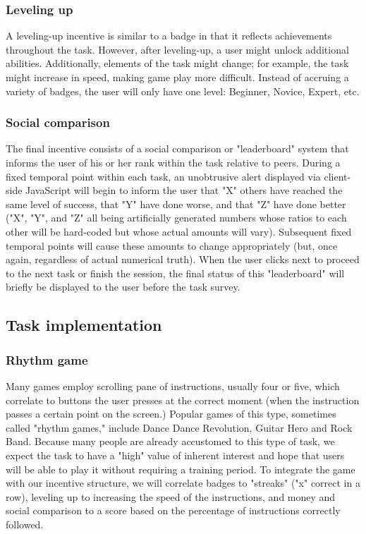 \subsubsection{Leveling up} 
A leveling-up incentive is similar to a badge in that it reflects achievements throughout the task. However, after leveling-up, a user might unlock additional abilities. Additionally, elements of the task might change; for example, the task might increase in speed, making game play more difficult. Instead of accruing a variety of badges, the user will only have one level: Beginner, Novice, Expert, etc. 
\subsubsection{Social comparison}
The final incentive consists of a social comparison or "leaderboard" system that informs the user of his or her rank within the task relative to peers. During a fixed temporal point within each task, an unobtrusive alert displayed via client-side JavaScript will begin to inform the user that "X" others have reached the same level of success, that "Y" have done worse, and that "Z" have done better ("X", "Y", and "Z" all being artificially generated numbers whose ratios to each other will be hard-coded but whose actual amounts will vary). Subsequent fixed temporal points will cause these amounts to change appropriately (but, once again, regardless of actual numerical truth). When the user clicks next to proceed to the next task or finish the session, the final status of this "leaderboard" will briefly be displayed to the user before the task survey.
 
 \subsection{Task implementation}
\subsubsection{Rhythm game}
Many games employ scrolling pane of instructions, usually four or five, which correlate to buttons the user presses at the correct moment (when the instruction passes a certain point on the screen.) Popular games of this type, sometimes called "rhythm games," include Dance Dance Revolution, Guitar Hero and Rock Band. Because many people are already accustomed to this type of task, we expect the task to have a "high" value of inherent interest and hope that users will be able to play it without requiring a training period. To integrate the game with our incentive structure, we will correlate badges to "streaks" ("x" correct in a row), leveling up to increasing the speed of the instructions, and money and social comparison to a score based on the percentage of instructions correctly followed.
